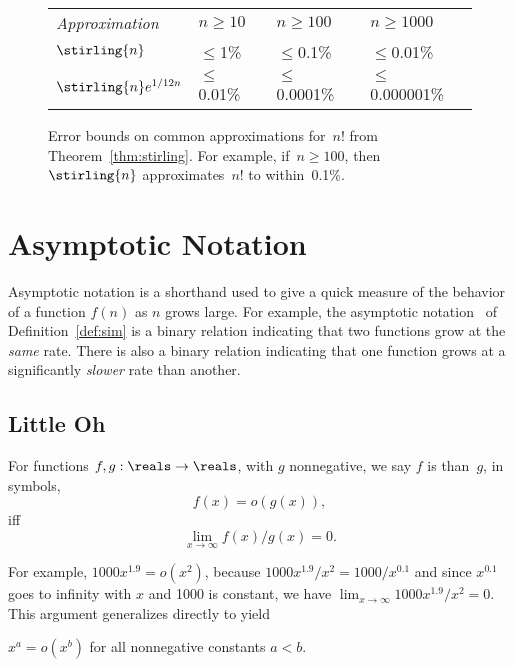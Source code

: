 \begin{figure}\redrawntrue

\renewcommand{\arraystretch}{1.5}

\begin{tabular}{l|lll}

\multicolumn{1}{l}{\emph{Approximation}}
    & $n \ge 10$ & $n \ge 100$ & $n \ge 1000$ \\
\cline{2-4}
$\stirling{n}$
    & ${}\le{}$1\%  & ${}\le{}$0.1\%    & ${}\le{}$0.01\%\\

$\stirling{n} e^{1/12n}$
    & ${}\le{}$0.01\%  & ${}\le{}$0.0001\%    & ${}\le{}$0.000001\%
\end{tabular}

\caption{Error bounds on common approximations for~$n!$ from
  Theorem~\ref{thm:stirling}.  For example, if~$n \ge 100$, then
  $\protect\stirling{n}$ approximates~$n!$ to within~0.1\%.}

\label{fig:9A1}

\end{figure}

\section{Asymptotic Notation}\label{asymptotic_sec}

Asymptotic notation is a shorthand used to give a quick measure of the
behavior of a function $f(n)$ as $n$ grows large.  For example, the
asymptotic notation~\idx{$\sim$} of Definition~\ref{def:sim} is a
binary relation indicating that two functions grow at the \emph{same}
rate.  There is also a binary relation indicating that one function
grows at a significantly \emph{slower} rate than another.


\subsection{Little Oh}

\begin{definition}
  For functions $f,g: \reals \to \reals$, with $g$ nonnegative, we say
  $f$ is  than~$g$, in symbols,
\[
f(x) = o(g(x)),
\]
iff
\[
\lim_{x \rightarrow \infty} f(x)/g(x) = 0.
\]
\end{definition}

For example, $1000x^{1.9} = o(x^2)$, because $1000x^{1.9}/x^2 =
1000/x^{0.1}$ and since $x^{0.1}$ goes to infinity with $x$ and 1000 is
constant, we have $\lim_{x \rightarrow \infty} 1000x^{1.9}/x^2 = 0$.
This argument generalizes directly to yield
\begin{lemma}\label{xaoxb}
$x^a = o(x^b)$ for all nonnegative constants $a<b$.
\end{lemma}

